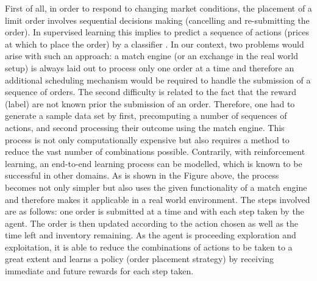     First of all, in order to respond to changing market conditions, the placement of a limit order involves sequential decisions making (cancelling and re-submitting the order). 
    In supervised learning this implies to predict a sequence of actions (prices at which to place the order) by a classifier \cite{sequence-prediction}.
    In our context, two problems would arise with such an approach:
    a match engine (or an exchange in the real world setup) is always laid out to process only one order at a time and therefore an additional scheduling mechanism would be required to handle the submission of a sequence of orders.
    The second difficulty is related to the fact that the reward (label) are not known prior the submission of an order.
    Therefore, one had to generate a sample data set by first, precomputing a number of sequences of actions, and second processing their outcome using the match engine.
    This process is not only computationally expensive but also requires a method to reduce the vast number of combinations possible.
    Contrarily, with reinforcement learning, an end-to-end learning process can be modelled, which is known to be successful in other domains\cite{amodei2016deep, mnih2015human, mnih2013playing}.
    As is shown in the Figure above, the process becomes not only simpler but also uses the given functionality of a match engine and therefore makes it applicable in a real world environment.
    The steps involved are as follows: one order is submitted at a time and with each step taken by the agent.
    The order is then updated according to the action chosen as well as the time left and inventory remaining.
    As the agent is proceeding exploration and exploitation, it is able to reduce the combinations of actions to be taken to a great extent and learns a policy (order placement strategy) by receiving immediate and future rewards for each step taken.
    
